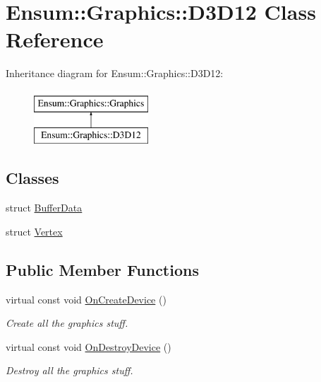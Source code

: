 \hypertarget{class_ensum_1_1_graphics_1_1_d3_d12}{}\section{Ensum\+:\+:Graphics\+:\+:D3\+D12 Class Reference}
\label{class_ensum_1_1_graphics_1_1_d3_d12}
Inheritance diagram for Ensum\+:\+:Graphics\+:\+:D3\+D12\+:\begin{figure}[H]
\begin{center}
\leavevmode
\includegraphics[height=2.000000cm]{class_ensum_1_1_graphics_1_1_d3_d12}
\end{center}
\end{figure}
\subsection*{Classes}
\begin{DoxyCompactItemize}
\item 
struct \hyperlink{struct_ensum_1_1_graphics_1_1_d3_d12_1_1_buffer_data}{Buffer\+Data}
\item 
struct \hyperlink{struct_ensum_1_1_graphics_1_1_d3_d12_1_1_vertex}{Vertex}
\end{DoxyCompactItemize}
\subsection*{Public Member Functions}
\begin{DoxyCompactItemize}
\item 
virtual const void \hyperlink{class_ensum_1_1_graphics_1_1_d3_d12_a566fc5ea52ee31cb32eebf8e65364460}{On\+Create\+Device} ()\hypertarget{class_ensum_1_1_graphics_1_1_d3_d12_a566fc5ea52ee31cb32eebf8e65364460}{}\label{class_ensum_1_1_graphics_1_1_d3_d12_a566fc5ea52ee31cb32eebf8e65364460}

\begin{DoxyCompactList}\small\item\em Create all the graphics stuff. \end{DoxyCompactList}\item 
virtual const void \hyperlink{class_ensum_1_1_graphics_1_1_d3_d12_a240e7a2dce61323726a41b557ee26a59}{On\+Destroy\+Device} ()\hypertarget{class_ensum_1_1_graphics_1_1_d3_d12_a240e7a2dce61323726a41b557ee26a59}{}\label{class_ensum_1_1_graphics_1_1_d3_d12_a240e7a2dce61323726a41b557ee26a59}

\begin{DoxyCompactList}\small\item\em Destroy all the graphics stuff. \end{DoxyCompactList}\end{DoxyCompactItemize}
